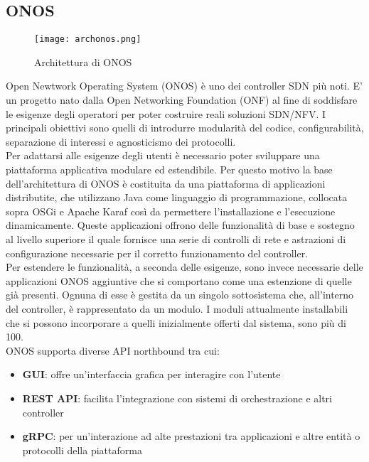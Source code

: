 \subsection{ONOS}
\begin{figure}[h]
    \centering
   \texttt{[image: archonos.png]}
    \caption{Architettura di ONOS}
    \label{fig:img3}
\end{figure}
Open Newtwork Operating System (ONOS) \cite{ONOS} è uno dei controller SDN più noti. 
E' un progetto nato dalla Open Networking Foundation (ONF) \cite{ONF} al fine di soddisfare le esigenze degli operatori per poter costruire reali soluzioni SDN/NFV.
I principali obiettivi sono quelli di introdurre modularità del codice, configurabilità, separazione di interessi e agnosticismo dei protocolli.
\\Per adattarsi alle esigenze degli utenti è necessario poter sviluppare una piattaforma applicativa modulare ed estendibile.
Per questo motivo la base dell'architettura di ONOS è costituita da una piattaforma di applicazioni distributite, che utilizzano Java come linguaggio di programmazione,
collocata sopra OSGi \cite{osgi} e Apache Karaf \cite{Apache} così da permettere l'installazione e l'esecuzione dinamicamente. 
Queste applicazioni offrono delle funzionalità di base e sostegno al livello superiore il quale fornisce una serie di controlli di rete e astrazioni di configurazione necessarie per il corretto funzionamento del controller.
\\Per estendere le funzionalità, a seconda delle esigenze, sono invece necessarie delle applicazioni ONOS aggiuntive che si comportano come una estenzione di quelle già presenti. 
Ognuna di esse è gestita da un singolo sottosistema che, all'interno del controller, è rappresentato da un modulo.
I moduli attualmente installabili che si possono incorporare a quelli inizialmente offerti dal sistema, sono più di 100.
\\ONOS supporta diverse API northbound tra cui:
\begin{itemize}
\item \textbf{GUI}: offre un'interfaccia grafica per interagire con l'utente
\item \textbf{REST API}: facilita l'integrazione con sistemi di orchestrazione e altri controller 
\item \textbf{gRPC}: per un'interazione ad alte prestazioni tra applicazioni e altre entità o protocolli della piattaforma
\end{itemize}
